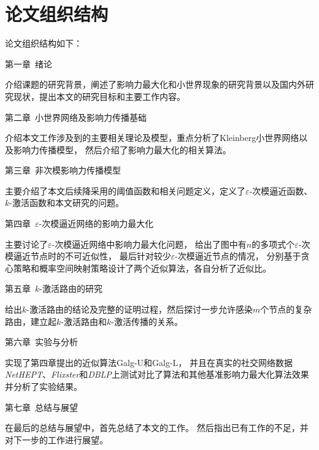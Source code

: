 \section{论文组织结构}
论文组织结构如下：

第一章~绪论

介绍课题的研究背景，阐述了影响力最大化和小世界现象的研究背景以及国内外研究现状，提出本文的研究目标和主要工作内容。

第二章~小世界网络及影响力传播基础

介绍本文工作涉及到的主要相关理论及模型，重点分析了Kleinberg小世界网络以及影响力传播模型，
然后介绍了影响力最大化的相关算法。

第三章~非次模影响力传播模型

主要介绍了本文后续降采用的阈值函数和相关问题定义，定义了$\varepsilon$-次模逼近函数、$k$-激活函数和本文研究的问题。

第四章~$\varepsilon$-次模逼近网络的影响力最大化

主要讨论了$\varepsilon$-次模逼近网络中影响力最大化问题，
给出了图中有$n$的多项式个$\varepsilon$-次模逼近节点时的不可近似性，
最后针对较少$\varepsilon$-次模逼近节点的情况，
分别基于贪心策略和概率空间映射策略设计了两个近似算法，各自分析了近似比。


第五章~$k$-激活路由的研究

给出$k$-激活路由的结论及完整的证明过程，然后探讨一步允许感染$m$个节点的复杂路由，建立起$k$-激活路由和$k$-激活传播的关系。


第六章~实验与分析

实现了第四章提出的近似算法\textsf{Galg-U}和\textsf{Galg-L}，
并且在真实的社交网络数据{\em NetHEPT}、{\em Flixster}和{\em DBLP}上测试对比了算法和其他基准影响力最大化算法效果并分析了实验结果。

第七章~总结与展望

在最后的总结与展望中，首先总结了本文的工作。
然后指出已有工作的不足，并对下一步的工作进行展望。